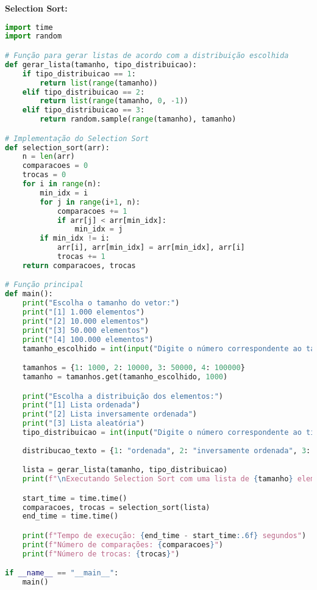 \documentclass[a4paper,12pt]{article}
\begin{document}
 \textbf{Selection Sort: } \\
\begin{lstlisting}[language=Python]
import time
import random

# Função para gerar listas de acordo com a distribuição escolhida
def gerar_lista(tamanho, tipo_distribuicao):
    if tipo_distribuicao == 1:
        return list(range(tamanho))
    elif tipo_distribuicao == 2:
        return list(range(tamanho, 0, -1))
    elif tipo_distribuicao == 3:
        return random.sample(range(tamanho), tamanho)

# Implementação do Selection Sort 
def selection_sort(arr):
    n = len(arr)
    comparacoes = 0
    trocas = 0
    for i in range(n):
        min_idx = i
        for j in range(i+1, n):
            comparacoes += 1
            if arr[j] < arr[min_idx]:
                min_idx = j
        if min_idx != i:
            arr[i], arr[min_idx] = arr[min_idx], arr[i]
            trocas += 1
    return comparacoes, trocas

# Função principal
def main():
    print("Escolha o tamanho do vetor:")
    print("[1] 1.000 elementos")
    print("[2] 10.000 elementos")
    print("[3] 50.000 elementos")
    print("[4] 100.000 elementos")
    tamanho_escolhido = int(input("Digite o número correspondente ao tamanho do vetor: "))

    tamanhos = {1: 1000, 2: 10000, 3: 50000, 4: 100000}
    tamanho = tamanhos.get(tamanho_escolhido, 1000)

    print("Escolha a distribuição dos elementos:")
    print("[1] Lista ordenada")
    print("[2] Lista inversamente ordenada")
    print("[3] Lista aleatória")
    tipo_distribuicao = int(input("Digite o número correspondente ao tipo de distribuição: "))
    
    distribucao_texto = {1: "ordenada", 2: "inversamente ordenada", 3: "aleatória"}

    lista = gerar_lista(tamanho, tipo_distribuicao)
    print(f"\nExecutando Selection Sort com uma lista de {tamanho} elementos ({distribucao_texto[tipo_distribuicao]}).\n")

    start_time = time.time()
    comparacoes, trocas = selection_sort(lista)
    end_time = time.time()

    print(f"Tempo de execução: {end_time - start_time:.6f} segundos")
    print(f"Número de comparações: {comparacoes}")
    print(f"Número de trocas: {trocas}")

if __name__ == "__main__":
    main()
\end{lstlisting}
\end{document}
